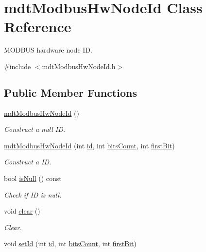 \hypertarget{classmdt_modbus_hw_node_id}{\section{mdt\-Modbus\-Hw\-Node\-Id Class Reference}
\label{classmdt_modbus_hw_node_id}
}


M\-O\-D\-B\-U\-S hardware node I\-D.  




{\ttfamily \#include $<$mdt\-Modbus\-Hw\-Node\-Id.\-h$>$}

\subsection*{Public Member Functions}
\begin{DoxyCompactItemize}
\item 
\hyperlink{classmdt_modbus_hw_node_id_acfc9339b173c702fb347070032ae59cd}{mdt\-Modbus\-Hw\-Node\-Id} ()
\begin{DoxyCompactList}\small\item\em Construct a null I\-D. \end{DoxyCompactList}\item 
\hyperlink{classmdt_modbus_hw_node_id_a01160c5106f36dbbbc61640f032e05dd}{mdt\-Modbus\-Hw\-Node\-Id} (int \hyperlink{classmdt_modbus_hw_node_id_a3daa8c9f772b3e97858d0d82eca31115}{id}, int \hyperlink{classmdt_modbus_hw_node_id_a501337cd2626d50ce214ec52ef07c3ac}{bits\-Count}, int \hyperlink{classmdt_modbus_hw_node_id_aec9a6b9536d1584888f160b118986412}{first\-Bit})
\begin{DoxyCompactList}\small\item\em Construct a I\-D. \end{DoxyCompactList}\item 
bool \hyperlink{classmdt_modbus_hw_node_id_ae34111c2beeb48829c7eee30f5fe845f}{is\-Null} () const 
\begin{DoxyCompactList}\small\item\em Check if I\-D is null. \end{DoxyCompactList}\item 
void \hyperlink{classmdt_modbus_hw_node_id_a84939120100872ee17b34feec09a61f3}{clear} ()
\begin{DoxyCompactList}\small\item\em Clear. \end{DoxyCompactList}\item 
void \hyperlink{classmdt_modbus_hw_node_id_ac2ea2c0eb0ee4b0540d61b80511e711f}{set\-Id} (int \hyperlink{classmdt_modbus_hw_node_id_a3daa8c9f772b3e97858d0d82eca31115}{id}, int \hyperlink{classmdt_modbus_hw_node_id_a501337cd2626d50ce214ec52ef07c3ac}{bits\-Count}, int \hyperlink{classmdt_modbus_hw_node_id_aec9a6b9536d1584888f160b118986412}{first\-Bit})

\end{DoxyCompactItemize}

